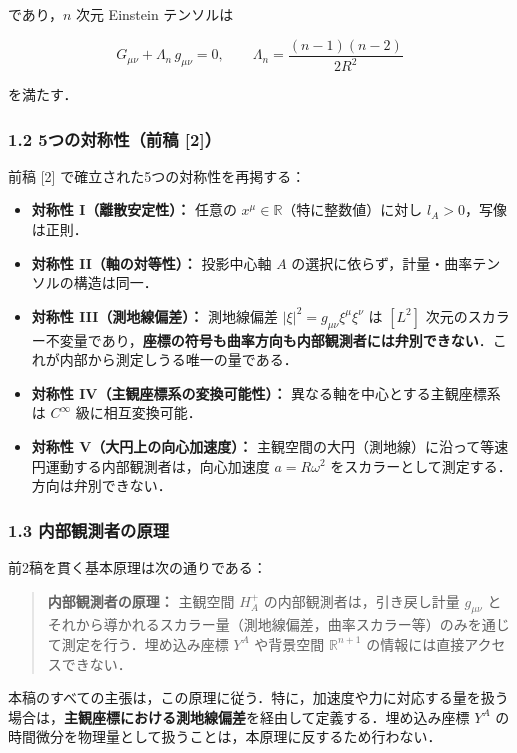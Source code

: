 \documentclass[a4paper,11pt]{ltjsarticle}
\theoremstyle{definition}
\begin{document}
であり，\(n\) 次元 Einstein テンソルは

\[G_{\mu\nu} + \Lambda_n\, g_{\mu\nu} = 0, \qquad \Lambda_n = \frac{(n-1)(n-2)}{2R^2} \tag{1.3}\]

を満たす．

\subsubsection{1.2 5つの対称性（前稿 {[}2{]}）}\label{ux3064ux306eux5bfeux79f0ux6027ux524dux7a3f-2}

前稿 {[}2{]} で確立された5つの対称性を再掲する：

\begin{itemize}
\tightlist
\item
  \textbf{対称性 I（離散安定性）：} 任意の \(x^\mu \in \mathbb{R}\)（特に整数値）に対し \(l_A > 0\)，写像は正則．
\item
  \textbf{対称性 II（軸の対等性）：} 投影中心軸 \(A\) の選択に依らず，計量・曲率テンソルの構造は同一．
\item
  \textbf{対称性 III（測地線偏差）：} 測地線偏差 \(|\xi|^2 = g_{\mu\nu}\xi^\mu\xi^\nu\) は \([L^2]\) 次元のスカラー不変量であり，\textbf{座標の符号も曲率方向も内部観測者には弁別できない}．これが内部から測定しうる唯一の量である．
\item
  \textbf{対称性 IV（主観座標系の変換可能性）：} 異なる軸を中心とする主観座標系は \(C^\infty\) 級に相互変換可能．
\item
  \textbf{対称性 V（大円上の向心加速度）：} 主観空間の大円（測地線）に沿って等速円運動する内部観測者は，向心加速度 \(a = R\omega^2\) をスカラーとして測定する．方向は弁別できない．
\end{itemize}

\subsubsection{1.3 内部観測者の原理}\label{ux5185ux90e8ux89b3ux6e2cux8005ux306eux539fux7406}

前2稿を貫く基本原理は次の通りである：

\begin{quote}
\textbf{内部観測者の原理：} 主観空間 \(H_A^+\) の内部観測者は，引き戻し計量 \(g_{\mu\nu}\) とそれから導かれるスカラー量（測地線偏差，曲率スカラー等）のみを通じて測定を行う．埋め込み座標 \(Y^A\) や背景空間 \(\mathbb{R}^{n+1}\) の情報には直接アクセスできない．
\end{quote}

本稿のすべての主張は，この原理に従う．特に，加速度や力に対応する量を扱う場合は，\textbf{主観座標における測地線偏差}を経由して定義する．埋め込み座標 \(Y^A\) の時間微分を物理量として扱うことは，本原理に反するため行わない．
\end{document}
